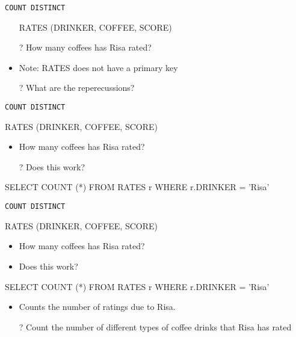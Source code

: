 \documentclass[aspectratio=169]{beamer}
\begin{document}
\begin{frame}{\texttt{COUNT DISTINCT}}


\begin{itemize}
\item[] RATES (DRINKER, COFFEE, SCORE)
\item[?] How many coffees has Risa rated?
\item Note: RATES does not have a primary key
\item[?] What are the reperecussions? %
\end{itemize}
\end{frame}

\begin{frame}[fragile]{\texttt{COUNT DISTINCT}}

RATES (DRINKER, COFFEE, SCORE)

\begin{itemize}
\item How many coffees has Risa rated?
\item[?] Does this work?
\end{itemize}

\begin{SQL}
SELECT COUNT (*)
FROM RATES r
WHERE r.DRINKER = 'Risa'
\end{SQL}

\end{frame}

\begin{frame}[fragile]{\texttt{COUNT DISTINCT}}

RATES (DRINKER, COFFEE, SCORE)

\begin{itemize}
\item How many coffees has Risa rated?
\item Does this work?
\end{itemize}

\begin{SQL}
SELECT COUNT (*)
FROM RATES r
WHERE r.DRINKER = 'Risa'
\end{SQL}

\begin{itemize}
	\item Counts the number of ratings due to Risa.
	\item[?] Count the number of different types of coffee drinks that Risa has rated
\end{itemize}
\end{frame}
\end{document}
